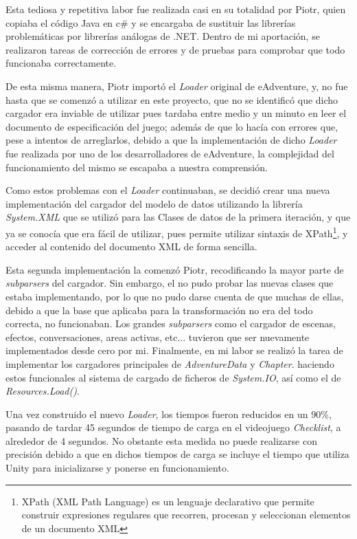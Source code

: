 Esta tediosa y repetitiva labor fue realizada casi en su totalidad por Piotr, quien copiaba el código Java en c\# y se encargaba de sustituir las librerías problemáticas por librerías análogas de .NET. Dentro de mi aportación, se realizaron tareas de corrección de errores y de pruebas para comprobar que todo funcionaba correctamente.

De esta misma manera, Piotr importó el \textit{Loader} original de eAdventure, y, no fue hasta que se comenzó a utilizar en este proyecto, que no se identificó que dicho cargador era inviable de utilizar pues tardaba entre medio y un minuto en leer el documento de especificación del juego; además de que lo hacía con errores que, pese a intentos de arreglarlos, debido a que la implementación de dicho \textit{Loader} fue realizada por uno de los desarrolladores de eAdventure, la complejidad del funcionamiento del mismo se escapaba a nuestra comprensión.

Como estos problemas con el \textit{Loader} continuaban, se decidió crear una nueva implementación del cargador del modelo de datos utilizando la librería \textit{System.XML} que se utilizó para las Clases de datos de la primera iteración, y que ya se conocía que era fácil de utilizar, pues permite utilizar sintaxis de XPath\footnote{XPath (XML Path Language) es un lenguaje declarativo que permite construir expresiones regulares que recorren, procesan y seleccionan elementos de un documento XML}, y acceder al contenido del documento XML de forma sencilla.

Esta segunda implementación la comenzó Piotr, recodificando la mayor parte de \textit{subparsers} del cargador. Sin embargo, el no pudo probar las nuevas clases que estaba implementando, por lo que no pudo darse cuenta de que muchas de ellas, debido a que la base que aplicaba para la transformación no era del todo correcta, no funcionaban. Los grandes \textit{subparsers} como el cargador de escenas, efectos, conversaciones, areas activas, etc... tuvieron que ser nuevamente implementados desde cero por mi. Finalmente, en mi labor se realizó la tarea de implementar los cargadores principales de \textit{AdventureData} y \textit{Chapter}. haciendo estos funcionales al sistema de cargado de ficheros de \textit{System.IO}, así como el de \textit{Resources.Load()}.

Una vez construido el nuevo \textit{Loader}, los tiempos fueron reducidos en un 90\%, pasando de tardar 45 segundos de tiempo de carga en el videojuego \textit{Checklist}, a alrededor de 4 segundos. No obstante esta medida no puede realizarse con precisión debido a que en dichos tiempos de carga se incluye el tiempo que utiliza Unity para inicializarse y ponerse en funcionamiento.

